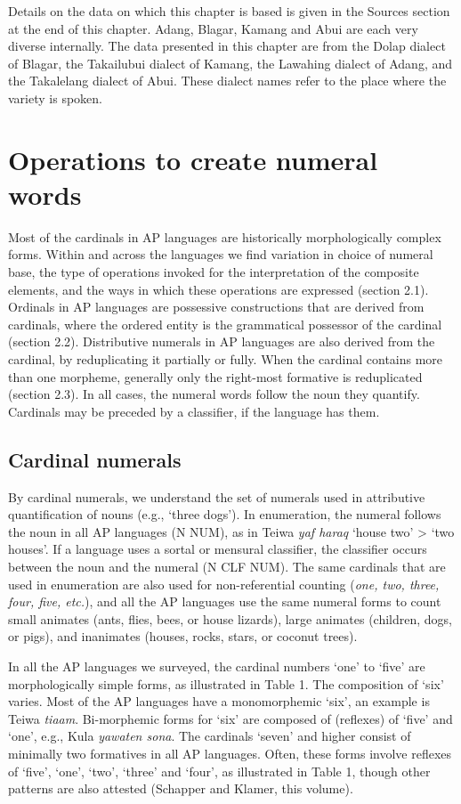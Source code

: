 Details on the data on which this chapter is based is given in the  Sources section at the end of this chapter. Adang, Blagar, Kamang and Abui are each very diverse internally. The data presented in this chapter are from the Dolap dialect of Blagar, the Takailubui dialect of Kamang, the Lawahing dialect of Adang, and the Takalelang dialect of Abui. These dialect names refer to the place where the variety is spoken.


\section{Operations to create numeral words}
Most of the cardinals in AP languages are historically morphologically complex forms. Within and across the languages we find variation in choice of numeral base, the type of operations invoked for the interpretation of the composite elements, and the ways in which these operations are expressed (section 2.1). Ordinals in AP languages are possessive constructions that are derived from cardinals, where the ordered entity is the grammatical possessor of the cardinal (section 2.2). Distributive numerals in AP languages are also derived from the cardinal, by reduplicating it partially or fully. When the cardinal contains more than one morpheme, generally only the right-most formative is reduplicated (section 2.3).  In all cases, the numeral words follow the noun they quantify. Cardinals may be preceded by a classifier, if the language has them.

\subsection{Cardinal numerals}
By cardinal numerals, we understand the set of numerals used in attributive quantification of nouns (e.g., `three dogs'). In enumeration, the numeral follows the noun in all AP languages (N NUM), as in Teiwa \textit{yaf haraq} `house two' {\textgreater} `two houses'. If a language uses a sortal or mensural classifier, the classifier occurs between the noun and the numeral (N CLF NUM). The same cardinals that are used in enumeration are also used for non-referential counting (\textit{one, two, three, four, five, etc.}), and all the AP languages use the same numeral forms to count small animates (ants, flies, bees, or house lizards), large animates (children, dogs, or pigs), and inanimates (houses, rocks, stars, or coconut trees).

In all the AP languages we surveyed, the cardinal numbers `one' to `five' are morphologically simple forms, as illustrated in Table 1. The composition of `six' varies. Most of the AP languages have a monomorphemic `six', an example is Teiwa \textit{tiaam}. Bi-morphemic forms for `six' are composed of (reflexes) of `five' and `one', e.g., Kula \textit{yawaten sona}. The cardinals `seven' and higher consist of minimally two formatives in all AP languages. Often, these forms involve reflexes of `five', `one', `two', `three' and `four', as illustrated in Table 1, though other patterns are also attested (Schapper and Klamer, this volume).

